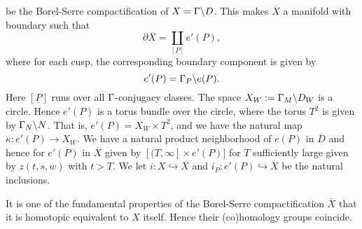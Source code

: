 be the Borel-Serre compactification of $X = \Gamma \backslash D$. This makes $\overline{X}$ a manifold with boundary such that
\[
\partial \overline{X} = \coprod_{[\underline{P}]} e'({P}),
\]
where for each cusp, the corresponding boundary component is given by
\[
e'(P) = \Gamma_P \backslash e(P).
\]
Here $[\underline{P}]$ runs over all $\Gamma$-conjugacy classes. The space $X_W := \Gamma_M \backslash D_W$ is a circle. Hence $e'(P)$ is a torus bundle over the circle, where the torus $T^2$ is given by $\Gamma_N \backslash N$. That is, $
e'(P) = X_W \times T^2$, and we have the natural map $\kappa: e'(P) \to X_W$. We have a natural product neighborhood of $e(P)$ in $\overline{D}$ and hence for $e'(P)$ in $\overline{X}$ given by $[(T,\infty] \times e'(P)]$ for $T$ sufficiently large given by $z(t,s,w)$ with $t>T$. We let $i: X \hookrightarrow \overline{X}$ and $i_P: e'(P)\hookrightarrow \overline{X} $ be the natural inclusions.

It is one of the fundamental properties of the Borel-Serre compactification $\overline{X}$ that it is homotopic equivalent to $X$ itself. Hence their (co)homology groups coincide. 

